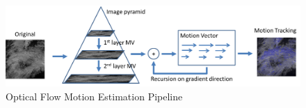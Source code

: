 \documentclass[conference]{IEEEtran}
\begin{document}
% 

\begin{figure}[tb]
\centering
\includegraphics[width=3 in]{OFME}
\caption{Optical Flow Motion Estimation Pipeline}
\label{fig:OFME}
\end{figure}







\end{document}

